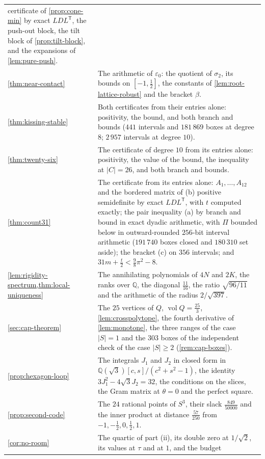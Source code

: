 \documentclass[11pt,reqno]{amsart}
\renewcommand{\_}{\origunderscore\allowbreak}
\numberwithin{equation}{section}
\theoremstyle{plain}
\theoremstyle{definition}
\theoremstyle{remark}
\DeclareMathOperator{\vol}{vol}
\begin{document}
\begin{longtable}{@{}p{}p{}@{}}
certificate of \cref{prop:cone-min} by exact $LDL^{\mathsf T}$, the push-out
block, the tilt block of \cref{prop:tilt-block}, and the expansions of
\cref{lem:pure-push}. \\
\cref{thm:near-contact} & The arithmetic of $\varepsilon_0$: the quotient
of $\sigma_2$, its bounds on $[-1,\frac12]$, the constants of
\cref{lem:root-lattice-robust} and the bracket $\beta$. \\
\cref{thm:kissing-stable} & Both certificates from their entries alone:
positivity, the bound, and both branch and bounds ($441$ intervals and
$181\,869$ boxes at degree $8$; $2\,957$ intervals at degree $10$). \\
\cref{thm:twenty-six} & The certificate of degree $10$ from its entries
alone: positivity, the value of the bound, the inequality at $|C|=26$, and
both branch and bounds. \\
\cref{thm:count31} & The certificate from its entries alone: $A_1,\dots,A_{12}$
and the bordered matrix of (b) positive semidefinite by exact
$LDL^{\mathsf T}$, with $t$ computed exactly; the pair inequality (a) by
branch and bound in exact dyadic arithmetic, with $\Pi$ bounded below in
outward-rounded $256$-bit interval arithmetic ($191\,740$ boxes closed and
$180\,310$ set aside); the bracket (c) on $356$ intervals; and
$31m+\frac t2<\frac98\pi^2-8$. \\
\cref{lem:rigidity-spectrum,thm:local-uniqueness} & The annihilating
polynomials of $4N$ and $2K$, the ranks over $\mathbb{Q}$, the diagonal
$\frac{11}{16}$, the ratio $\sqrt{96/11}$ and the arithmetic of the radius
$2/\sqrt{397}$. \\
\cref{sec:cap-theorem} & The $25$ vertices of $Q$, $\vol Q=\frac{25}3$,
\cref{lem:crosspolytope}, the fourth derivative of \cref{lem:monotone},
the three ranges of the case $|S|=1$ and the $303$ boxes of the
independent check of the case $|S|\ge2$ (\cref{rem:cap-boxes}). \\
\cref{prop:hexagon-loop} & The integrals $J_1$ and $J_2$ in closed form in
$\mathbb{Q}(\sqrt3)[c,s]/(c^2+s^2-1)$, the identity
$3J_1^2-4\sqrt3J_2=32$, the conditions on the slices, the Gram matrix at
$\theta=0$ and the perfect square. \\
\cref{prop:second-code} & The $24$ rational points of $S^3$, their slack
$\frac{849}{50000}$ and the inner product at distance $\frac{57}{250}$
from $-1,-\frac12,0,\frac12,1$. \\
\cref{cor:no-room} & The quartic of part (ii), its double zero at
$1/\sqrt2$, its values at $\tau$ and at $1$, and the budget

\end{longtable}
\end{document}
